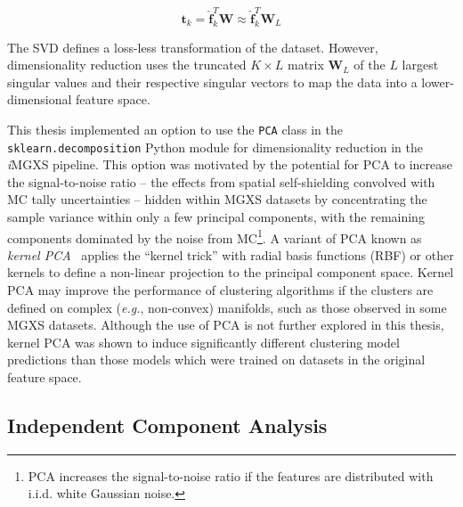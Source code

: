 \begin{equation}
\label{eqn:chap10-svd-transform-sample}
\boldsymbol{t}_{k} = \boldsymbol{\hat{f}}_{k}^{T}\boldsymbol{W} \approx \boldsymbol{\hat{f}}_{k}^{T}\boldsymbol{W}_{L}
\end{equation}

\noindent The SVD defines a loss-less transformation of the dataset. However, dimensionality reduction uses the truncated $K \times L$ matrix $\boldsymbol{W}_{L}$ of the $L$ largest singular values and their respective singular vectors to map the data into a lower-dimensional feature space.

This thesis implemented an option to use the \texttt{PCA} class in the \texttt{sklearn.decomposition} Python module for dimensionality reduction in the \textit{i}\ac{MGXS} pipeline. This option was motivated by the potential for PCA to increase the signal-to-noise ratio -- the effects from spatial self-shielding convolved with \ac{MC} tally uncertainties -- hidden within \ac{MGXS} datasets by concentrating the sample variance within only a few principal components, with the remaining components dominated by the noise from \ac{MC}\footnote{PCA increases the signal-to-noise ratio if the features are distributed with i.i.d. white Gaussian noise.}. A variant of PCA known as \textit{kernel PCA}~\cite{scholkopf1997kernelpca} applies the ``kernel trick'' with radial basis functions (RBF) or other kernels to define a non-linear projection to the principal component space. Kernel PCA may improve the performance of clustering algorithms if the clusters are defined on complex (\textit{e.g.}, non-convex) manifolds, such as those observed in some \ac{MGXS} datasets. Although the use of PCA is not further explored in this thesis, kernel PCA was shown to induce significantly different clustering model predictions than those models which were trained on datasets in the original feature space.


  
\subsection{Independent Component Analysis}
\label{subsec:chap10-ica}

